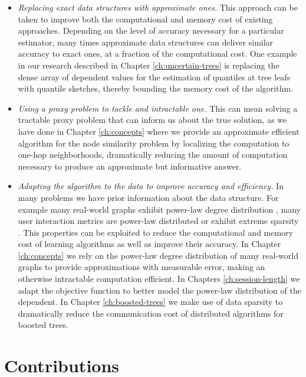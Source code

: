 \begin{itemize}
	\item \emph{Replacing exact data structures with approximate ones.} This approach can be taken
	to improve both the computational and memory cost of existing approaches. Depending on the
	level of accuracy necessary for a particular estimator, many times approximate data structures
	can deliver similar accuracy to exact ones, at a fraction of the computational cost.
	One example in our research described in Chapter \ref{ch:uncertain-trees} is replacing the dense array of dependent values for the
	estimation of quantiles at tree leafs with quantile sketches, thereby bounding the
	memory cost of the algorithm.
	\item \emph{Using a proxy problem to tackle and intractable one.} This can mean solving a
	tractable proxy problem that can inform us about the true solution, as we have done
	in Chapter \ref{ch:concepts} where we provide an approximate efficient algorithm for the node similarity problem by localizing the computation to one-hop neighborhoods, dramatically reducing the
	amount of computation necessary to produce an approximate but informative answer.
	\item \emph{Adapting the algorithm to the data to improve accuracy and efficiency.} In many problems
	we have prior information about the data structure. For example many real-world graphs exhibit
	power-law degree distribution \cite{small-world}, many user interaction metrics are power-law
	distributed \cite{phonecalls, faloutsos1999internet, barabasi-small-world, click-stream-power-law} or exhibit extreme sparsity \cite{esl}. This properties can
	be exploited to reduce the computational and memory cost of learning algorithms as well as
	improve their accuracy. In Chapter \ref{ch:concepts} we rely on the power-law degree
	distribution of many real-world graphs to provide approximations with measurable error,
	making an otherwise intractable computation efficient. In Chapters \ref{ch:session-length}
	we adapt the objective function to better model the power-law distribution of the dependent.
	In Chapter \ref{ch:boosted-trees} we make use of data sparsity to dramatically reduce
	the communication cost of distributed algorithms for boosted trees.
\end{itemize}

\section{Contributions}

